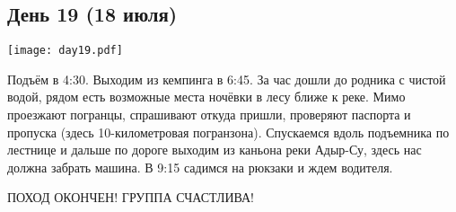 \graphicspath{{Pictures/Chapter5/Day19}}



\subsection{День 19 (18 июля)}\label{subsec:Day19}
    \parbox[c]{\textwidth}{%
        \texttt{[image: day19.pdf]}\label{fig:Day19_map}%
    }
    \vspace{0.8cm}

Подъём в 4:30. Выходим из кемпинга в 6:45. За час дошли до родника с чистой водой, рядом есть возможные места ночёвки в лесу ближе к реке. Мимо проезжают погранцы, спрашивают откуда пришли, проверяют паспорта и пропуска (здесь 10-километровая погранзона). Спускаемся вдоль подъемника по лестнице и дальше по дороге выходим из каньона реки Адыр-Су, здесь нас должна забрать машина. В 9:15 садимся на рюкзаки и ждем водителя.

ПОХОД ОКОНЧЕН! ГРУППА СЧАСТЛИВА!








    \FloatBarrier

